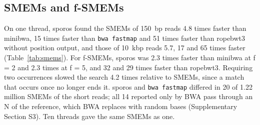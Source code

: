 

\subsection{SMEMs and f-SMEMs}

On one thread, sporos found the SMEMs of 150~bp reads 4.8 times faster than minibwa, 15 times faster than \texttt{bwa fastmap} and 51 times faster than ropebwt3 without position output, and those of 10~kbp reads 5.7, 17 and 65 times faster (Table~\ref{tab:smems}). For f-SMEMs, sporos was 2.3 times faster than minibwa at f = 2 and 2.3 times at f = 5, and 32 and 29 times faster than ropebwt3. Requiring two occurrences slowed the search 4.2 times relative to SMEMs, since a match that occurs once no longer ends it. sporos and \texttt{bwa fastmap} differed in 20 of 1.22 million SMEMs of the short reads; all 14 reported only by BWA pass through an N of the reference, which BWA replaces with random bases (Supplementary Section S3). Ten threads gave the same SMEMs as one.




